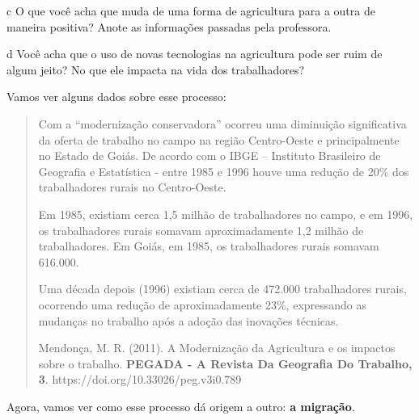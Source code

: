 
\num{c} O que você acha que muda de uma forma de agricultura para a outra de
maneira positiva? Anote as informações passadas pela professora. 



\num{d} Você acha que o uso de novas tecnologias na agricultura pode ser ruim de
algum jeito? No que ele impacta na vida dos trabalhadores?


Vamos ver alguns dados sobre esse processo:

\begin{quote}
Com a ``modernização conservadora'' ocorreu uma diminuição significativa
da oferta de trabalho no campo na região Centro-Oeste e principalmente
no Estado de Goiás. De acordo com o IBGE -- Instituto Brasileiro de
Geografia e Estatística - entre 1985 e 1996 houve uma redução de 20\%
dos trabalhadores rurais no Centro-Oeste.

Em 1985, existiam cerca 1,5 milhão de trabalhadores no campo, e em 1996,
os trabalhadores rurais somavam aproximadamente 1,2 milhão de
trabalhadores. Em Goiás, em 1985, os trabalhadores rurais somavam
616.000.

Uma década depois (1996) existiam cerca de 472.000 trabalhadores rurais,
ocorrendo uma redução de aproximadamente 23\%, expressando as mudanças
no trabalho após a adoção das inovações técnicas.

Mendonça, M. R. (2011). A Modernização da Agricultura e os impactos
sobre o trabalho. \textbf{PEGADA - A Revista Da Geografia Do Trabalho,
3}. https://doi.org/10.33026/peg.v3i0.789
\end{quote}


Agora, vamos ver como esse processo dá origem a outro: \textbf{a migração}.


